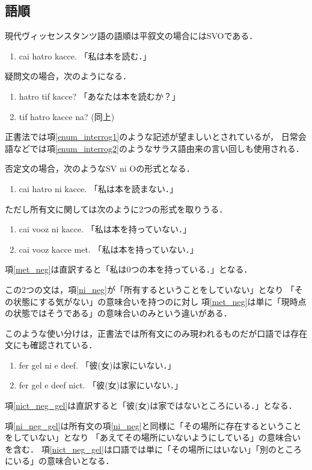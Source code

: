 \documentclass[a4paper,xelatex,ja=standard]{bxjsarticle}
\begin{document}
\subsection{語順}
現代ヴィッセンスタンツ語の語順は平叙文の場合にはSVOである．
\begin{enumerate}
 \item cai hatro kacce. 「私は本を読む．」 
\end{enumerate}

疑問文の場合，次のようになる．
\begin{enumerate}
 \item hatro tif kacce? 「あなたは本を読むか？」 \label{enum_interrog1}
 \item tif hatro kacce na? (同上) \label{enum_interrog2}
\end{enumerate}
正書法では項\ref{enum_interrog1}のような記述が望ましいとされているが，
日常会語などでは項\ref{enum_interrog2}のようなサラス語由来の言い回しも使用される．

否定文の場合，次のようなSV ni Oの形式となる．
\begin{enumerate}
 \item cai hatro ni kacce. 「私は本を読まない．」
\end{enumerate}
ただし所有文に関しては次のように2つの形式を取りうる．
\begin{enumerate}
 \item cai vooz ni kacce. 「私は本を持っていない．」 \label{ni_neg}
 \item cai vooz kacce met. 「私は本を持っていない．」\label{met_neg}
\end{enumerate}
項\ref{met_neg}は直訳すると「私は0つの本を持っている．」となる．

この2つの文は，項\ref{ni_neg}が「所有するということをしていない」となり
「その状態にする気がない」の意味合いを持つのに対し
項\ref{met_neg}は単に「現時点の状態ではそうである」の意味合いのみという違いがある．

このような使い分けは，正書法では所有文にのみ現われるものだが口語では存在文にも確認されている．
\begin{enumerate}
 \item fer gel ni e deef. 「彼(女)は家にいない．」\label{ni_neg_gel}
 \item fer gel e deef nict. 「彼(女)は家にいない．」\label{nict_neg_gel}
\end{enumerate}
項\ref{nict_neg_gel}は直訳すると「彼(女)は家ではないところにいる．」となる．

項\ref{ni_neg_gel}は所有文の項\ref{ni_neg}と同様に「その場所に存在するということをしていない」となり
「あえてその場所にいないようにしている」の意味合いを含む．
項\ref{nict_neg_gel}は口語では単に「その場所にはいない」「別のところにいる」の意味合いとなる．
\end{document}
